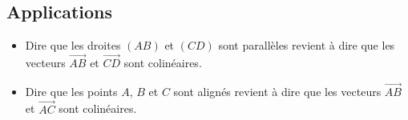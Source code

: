 \subsection{Applications}

\begin{prop}
	\nline
	\begin{itemize}
		\item Dire que les droites $(AB)$ et $(CD)$ sont parallèles revient à dire que les vecteurs $\vec{AB}$ et $\vec{CD}$ sont colinéaires.
		\item Dire que les points $A$, $B$ et $C$ sont alignés revient à dire que les vecteurs $\vec{AB}$ et $\vec{AC}$ sont colinéaires.
	\end{itemize}
\end{prop}

